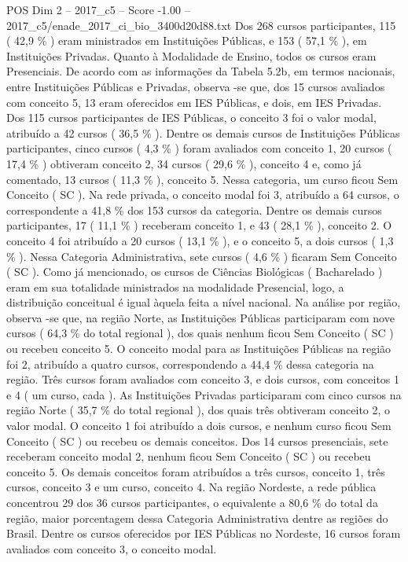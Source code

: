 \begin{textsample}{POS Dim 2 – 2017\_c5 – Score -1.00 – 2017\_c5/enade\_2017\_ci\_bio\_3400d20d88.txt}
Dos 268 cursos participantes, 115 ( 42,9 \% ) eram ministrados em Instituições Públicas, e 153 ( 57,1 \% ), em Instituições Privadas.
Quanto à Modalidade de Ensino, todos os cursos eram Presenciais.
De acordo com as informações da Tabela 5.2b, em termos nacionais, entre Instituições Públicas e Privadas, observa -se que, dos 15 cursos avaliados com conceito 5, 13 eram oferecidos em IES Públicas, e dois, em IES Privadas.
Dos 115 cursos participantes de IES Públicas, o conceito 3 foi o valor modal, atribuído a 42 cursos ( 36,5 \% ).
Dentre os demais cursos de Instituições Públicas participantes, cinco cursos ( 4,3 \% ) foram avaliados com conceito 1, 20 cursos ( 17,4 \% ) obtiveram conceito 2, 34 cursos ( 29,6 \% ), conceito 4 e, como já comentado, 13 cursos ( 11,3 \% ), conceito 5.
Nessa categoria, um curso ficou Sem Conceito ( SC ).
Na rede privada, o conceito modal foi 3, atribuído a 64 cursos, o correspondente a 41,8 \% dos 153 cursos da categoria.
Dentre os demais cursos participantes, 17 ( 11,1 \% ) receberam conceito 1, e 43 ( 28,1 \% ), conceito 2.
O conceito 4 foi atribuído a 20 cursos ( 13,1 \% ), e o conceito 5, a dois cursos ( 1,3 \% ).
Nessa Categoria Administrativa, sete cursos ( 4,6 \% ) ficaram Sem Conceito ( SC ).
Como já mencionado, os cursos de Ciências Biológicas ( Bacharelado ) eram em sua totalidade ministrados na modalidade Presencial, logo, a distribuição conceitual é igual àquela feita a nível nacional.
Na análise por região, observa -se que, na região Norte, as Instituições Públicas participaram com nove cursos ( 64,3 \% do total regional ), dos quais nenhum ficou Sem Conceito ( SC ) ou recebeu conceito 5.
O conceito modal para as Instituições Públicas na região foi 2, atribuído a quatro cursos, correspondendo a 44,4 \% dessa categoria na região.
Três cursos foram avaliados com conceito 3, e dois cursos, com conceitos 1 e 4 ( um curso, cada ).
As Instituições Privadas participaram com cinco cursos na região Norte ( 35,7 \% do total regional ), dos quais três obtiveram conceito 2, o valor modal.
O conceito 1 foi atribuído a dois cursos, e nenhum curso ficou Sem Conceito ( SC ) ou recebeu os demais conceitos.
Dos 14 cursos presenciais, sete receberam conceito modal 2, nenhum ficou Sem Conceito ( SC ) ou recebeu conceito 5.
Os demais conceitos foram atribuídos a três cursos, conceito 1, três cursos, conceito 3 e um curso, conceito 4.
Na região Nordeste, a rede pública concentrou 29 dos 36 cursos participantes, o equivalente a 80,6 \% do total da região, maior porcentagem dessa Categoria Administrativa dentre as regiões do Brasil.
Dentre os cursos oferecidos por IES Públicas no Nordeste, 16 cursos foram avaliados com conceito 3, o conceito modal.

\end{textsample}
